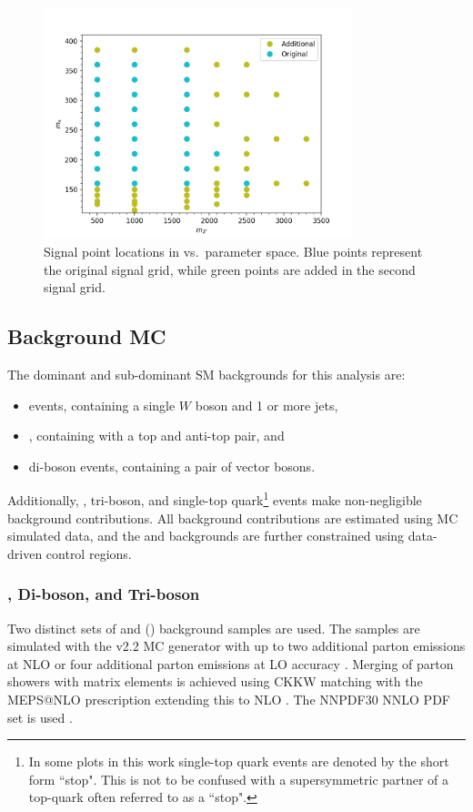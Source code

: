 \begin{figure}[H]
    \centering
    \includegraphics[width=0.8\textwidth]{Figures/3/SignalGrid.png}
    \caption{Signal point locations in \ms vs.~\mZp parameter space. Blue points represent the original signal grid, while green points are added in the second signal grid.}
    \label{fig:signal_grid}
\end{figure}

\subsection{Background MC}
\label{subsection:mc_bkg}
The dominant and sub-dominant SM backgrounds for this analysis are:
\begin{itemize}
    \item \wjets events, containing a single $W$ boson and 1 or more jets,
    \item \ttbar, containing with a top and anti-top pair, and
    \item di-boson events, containing a pair of vector bosons.
\end{itemize}
Additionally, \zjets, tri-boson, and single-top quark\footnote{In some plots in this work single-top quark events are denoted by the short form ``stop". This is not to be confused with a supersymmetric partner of a top-quark often referred to as a ``stop".} events make non-negligible background contributions. All background contributions are estimated using MC simulated data, and the \wjets and \ttbar backgrounds are further constrained using data-driven control regions.

\subsubsection{\vjets, Di-boson, and Tri-boson}
Two distinct sets of \wjets and \zjets (\vjets) background samples are used. The samples are simulated with the \sherpa v2.2 MC generator \cite{Sherpa} with up to two additional parton emissions at NLO or four additional parton emissions at LO accuracy \cite{VJets}\cite{VJets_mW}. Merging of parton showers with matrix elements is achieved using CKKW \cite{CKKW} matching with the MEPS@NLO prescription extending this to NLO \cite{MEPS}. The NNPDF30 NNLO PDF set is used \cite{PDF30}.

